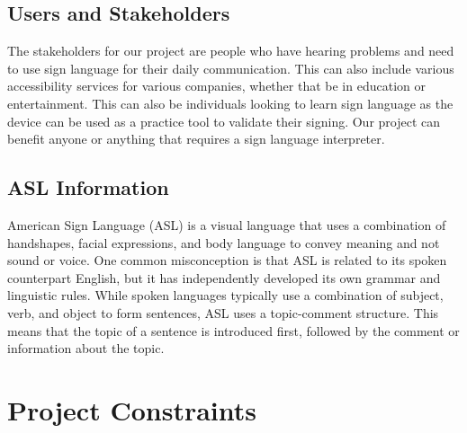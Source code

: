\documentclass[12pt]{article}
\begin{document}
\subsection{Users and Stakeholders}
The stakeholders for our project are people who have hearing problems and need to use sign language for their daily communication. This 
can also include various accessibility services for various companies, whether that be in education or entertainment. This can also be 
individuals looking to learn sign language as the device can be used as a practice tool to validate their signing. Our project can benefit 
anyone or anything that requires a sign language interpreter.\\

\subsection{ASL Information}
American Sign Language (ASL) is a visual language that uses a combination of handshapes, facial expressions, and body language to convey meaning and not sound or voice. One common misconception is that ASL is related to its spoken counterpart English, but it has independently developed its own grammar and linguistic rules. While spoken languages typically use a combination of subject, verb, and object to form sentences, ASL uses a topic-comment structure. This means that the topic of a sentence is introduced first, followed by the comment or information about the topic.

\section{Project Constraints}
\end{document}
